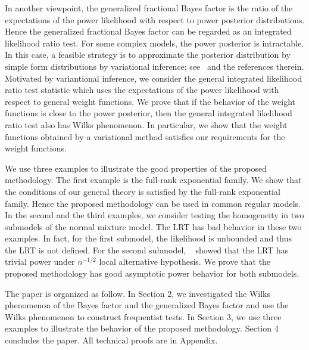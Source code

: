 \documentclass[11pt]{article}
\theoremstyle{plain}
\theoremstyle{definition}
\theoremstyle{remark}
\begin{document}
In another viewpoint,
the generalized fractional Bayes factor is the ratio of the expectations of the power likelihood with respect to power posterior distributions.
Hence the generalized fractional Bayes factor can be regarded as an integrated likelihood ratio test.
For some complex models, the power posterior is intractable.
In this case, 
a feasible strategy is to approximate the posterior distribution by simple form distributions by variational inference; see~\cite{blei2017} and the references therein.
Motivated by variantional inference, we consider the general integrated likelihood ratio test statistic which uses the expectations of the power likelihood with respect to general weight functions.
We prove that if the behavior of the weight functions is close to the power posterior, then the general integrated likelihood ratio test also has Wilks phenomenon.
In particular, we show that the weight functions obtained by a variational method satisfies our requirements for the weight functions.


We use three examples to illustrate the good properties of the proposed methodology.
The first example is the full-rank exponential family.
We show that the conditions of our general theory is satisfied by the full-rank exponential family.
Hence the proposed methodology can be used in common regular models.
In the second and the third examples, we consider testing the homogeneity in two submodels of the normal mixture model.
The LRT has bad behavior in these two examples.
In fact, for the first submodel, the likelihood is unbounded and thus the LRT is not defined.
For the second submodel, %
~\cite{HALL2005158} showed that the LRT has trivial power under $n^{-1/2}$ local alternative hypothesis. 
We prove that the proposed methodology has good asymptotic power behavior for both submodels.

The paper is organized as follow.
In Section 2, we investigated the Wilks phenomenon of the Bayes factor and the generalized Bayes factor and use the Wilks phenomenon to construct frequentist tests.
In Section 3, we use three examples to illustrate the behavior of the proposed methodology.
Section 4 concludes the paper.
All technical proofs are in Appendix.
\end{document}
